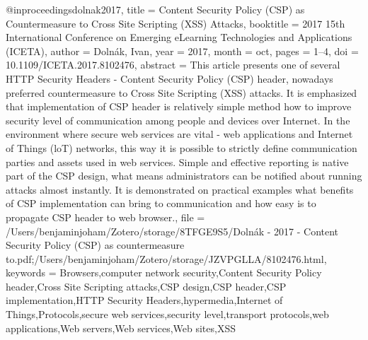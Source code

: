 @inproceedings{dolnak2017,
  title = {Content {{Security Policy}} ({{CSP}}) as Countermeasure to {{Cross Site Scripting}} ({{XSS}}) Attacks},
  booktitle = {2017 15th {{International Conference}} on {{Emerging eLearning Technologies}} and {{Applications}} ({{ICETA}})},
  author = {Doln{\'a}k, Ivan},
  year = {2017},
  month = oct,
  pages = {1--4},
  doi = {10.1109/ICETA.2017.8102476},
  abstract = {This article presents one of several HTTP Security Headers - Content Security Policy (CSP) header, nowadays preferred countermeasure to Cross Site Scripting (XSS) attacks. It is emphasized that implementation of CSP header is relatively simple method how to improve security level of communication among people and devices over Internet. In the environment where secure web services are vital - web applications and Internet of Things (loT) networks, this way it is possible to strictly define communication parties and assets used in web services. Simple and effective reporting is native part of the CSP design, what means administrators can be notified about running attacks almost instantly. It is demonstrated on practical examples what benefits of CSP implementation can bring to communication and how easy is to propagate CSP header to web browser.},
  file = {/Users/benjaminjoham/Zotero/storage/8TFGE9S5/Dolnák - 2017 - Content Security Policy (CSP) as countermeasure to.pdf;/Users/benjaminjoham/Zotero/storage/JZVPGLLA/8102476.html},
  keywords = {Browsers,computer network security,Content Security Policy header,Cross Site Scripting attacks,CSP design,CSP header,CSP implementation,HTTP Security Headers,hypermedia,Internet of Things,Protocols,secure web services,security level,transport protocols,web applications,Web servers,Web services,Web sites,XSS}
}

